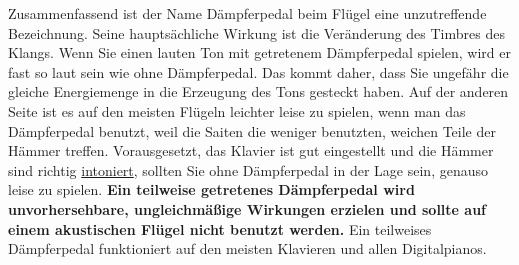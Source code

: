 Zusammenfassend ist der Name Dämpferpedal beim Flügel eine unzutreffende Bezeichnung.
Seine hauptsächliche Wirkung ist die Veränderung des Timbres des Klangs.
Wenn Sie einen lauten Ton mit getretenem Dämpferpedal spielen, wird er fast so laut sein wie ohne Dämpferpedal.
Das kommt daher, dass Sie ungefähr die gleiche Energiemenge in die Erzeugung des Tons gesteckt haben.
Auf der anderen Seite ist es auf den meisten Flügeln leichter leise zu spielen, wenn man das Dämpferpedal benutzt, weil die Saiten die weniger benutzten, weichen Teile der Hämmer treffen.
Vorausgesetzt, das Klavier ist gut eingestellt und die Hämmer sind richtig \hyperref[c2_7_hamm]{intoniert}, sollten Sie ohne Dämpferpedal in der Lage sein, genauso leise zu spielen.
\textbf{Ein teilweise getretenes Dämpferpedal wird unvorhersehbare, ungleichmäßige Wirkungen erzielen und sollte auf einem akustischen Flügel nicht benutzt werden.}
Ein teilweises Dämpferpedal funktioniert auf den meisten Klavieren und allen Digitalpianos.





